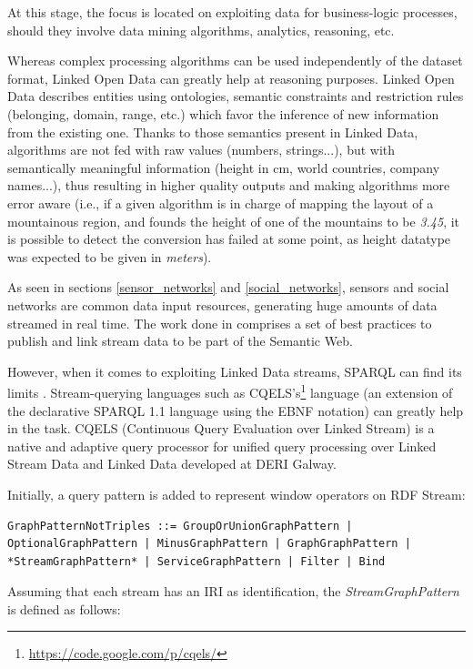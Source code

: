 At this stage, the focus is located on exploiting data for business-logic processes, should they involve data mining algorithms, analytics, reasoning, etc.

Whereas complex processing algorithms can be used independently of the dataset format, Linked Open Data can greatly help at reasoning purposes. Linked Open Data describes entities using ontologies, semantic constraints and restriction rules (belonging, domain, range, etc.) which favor the inference of new information from the existing one. Thanks to those semantics present in Linked Data, algorithms are not fed with raw values (numbers, strings...), but with semantically meaningful information (height in cm, world countries, company names...), thus resulting in higher quality outputs and making algorithms more error aware (i.e., if a given algorithm is in charge of mapping the layout of a mountainous region, and founds the height of one of the mountains to be \textit{3.45}, it is possible to detect the conversion has failed at some point, as height datatype was expected to be given in \textit{meters}).

As seen in sections \ref{sensor_networks} and \ref{social_networks}, sensors and social networks are common data input resources, generating huge amounts of data streamed in real time. The work done in \cite{sequeda2009linked} comprises a set of best practices to publish and link stream data to be part of the Semantic Web.

However, when it comes to exploiting Linked Data streams, SPARQL can find its limits \cite{della2009s}. Stream-querying languages such as CQELS's\footnote{\url{https://code.google.com/p/cqels/}} language (an extension of the declarative SPARQL 1.1 language using the EBNF notation) can greatly help in the task. CQELS \cite{le2011native} (Continuous Query Evaluation over Linked Stream) is a native and adaptive query processor for unified query processing over Linked Stream Data and Linked Data developed at DERI Galway.  

Initially, a query pattern is added to represent window operators on RDF Stream:

\begin{lstlisting}
GraphPatternNotTriples ::= GroupOrUnionGraphPattern |
OptionalGraphPattern | MinusGraphPattern | GraphGraphPattern |
*StreamGraphPattern* | ServiceGraphPattern | Filter | Bind
\end{lstlisting}

Assuming that each stream has an IRI as identification, the \textit{StreamGraphPattern} is defined as follows:

